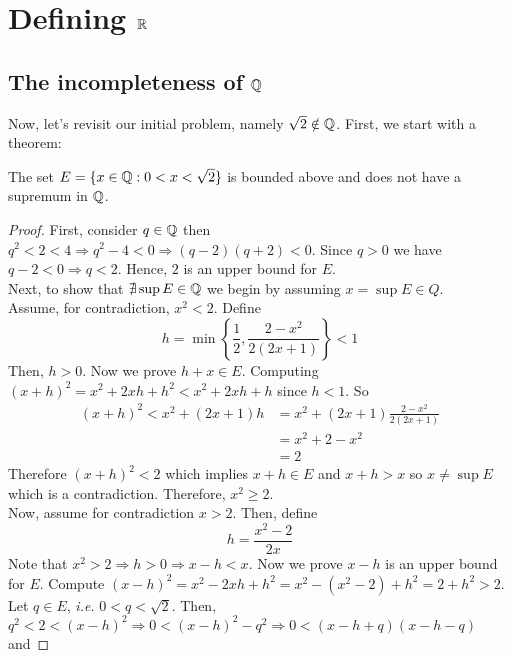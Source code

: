 \section{Defining $\mathbb{R}$}

\subsection{The incompleteness of $\mathbb{Q}$}

Now, let's revisit our initial problem, namely $\sqrt{2} \notin \mathbb{Q}$. First, we start with a theorem:

\begin{theorem}
    The set $E = \{ x \in \mathbb{Q}: 0 < x < \sqrt{2}\}$ is bounded above and does not have a supremum in $\mathbb{Q}$.
\end{theorem}

\begin{proof}
    First, consider $q \in \mathbb{Q}$ then $q^2 <  2 < 4 \Rightarrow q^2 - 4 < 0 \Rightarrow (q-2)(q+2) < 0$. Since $q > 0$ we have $q - 2 < 0 \Rightarrow q <  2$. Hence, $2$ is an upper bound for $E$.\\
    Next, to show that $\nexists \sup E \in \mathbb{Q}$ we begin by assuming $x = \sup E \in Q$. \\
    Assume, for contradiction, $x^2 < 2$. Define
    \begin{equation*}
        h = \min \left\{ 
            \frac{1}{2}, \frac{2 - x^2}{2(2x+1)}
        \right\} < 1
    \end{equation*}
    Then, $h > 0$. Now we prove $h + x \in E$. Computing $(x+h)^2 = x^2 +2xh + h^2 < x^2 + 2xh + h$ since $h < 1$. So
    \begin{equation*}
        \begin{split}
            (x+ h)^2 < x^2 + (2x + 1)h &= x^2 + (2x+1)\frac{2-x^2}{2(2x+1)} \\
            &= x^2 + 2 - x^2 \\
            &= 2
        \end{split}
    \end{equation*}
    Therefore $(x+h)^2 < 2$ which implies $x + h \in E$ and $x + h > x$ so $x \neq \sup E$ which is a contradiction. Therefore, $x^2 \geq 2$. \\
    Now, assume for contradiction $x > 2$. Then, define
    \begin{equation*}
        h = \frac{x^2 - 2}{2x}
    \end{equation*}
    Note that $x^2 > 2 \Rightarrow h > 0 \Rightarrow x - h < x$. Now we prove $x-h$ is an upper bound for $E$. Compute $(x-h)^2 = x^2 -2xh + h^2 = x^2 - (x^2 - 2) + h^2 = 2 + h^2 > 2$. Let $q \in E$, \emph{i.e.} $0 < q < \sqrt{2}$. Then, $q^2 < 2 < (x - h)^2 \Rightarrow 0 <  (x - h)^2 - q^2 \Rightarrow 0 < (x-h+q)(x-h-q)$ and

\end{proof}

